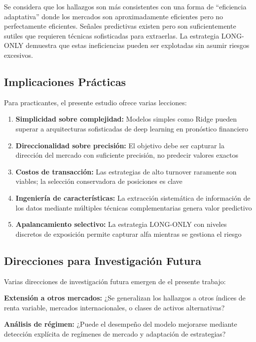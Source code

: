 \documentclass[11pt,a4paper]{article}
\begin{document}
Se considera que los hallazgos son más consistentes con una forma de ``eficiencia adaptativa'' donde los mercados son aproximadamente eficientes pero no perfectamente eficientes. Señales predictivas existen pero son suficientemente sutiles que requieren técnicas sofisticadas para extraerlas. La estrategia LONG-ONLY demuestra que estas ineficiencias pueden ser explotadas sin asumir riesgos excesivos.

\subsection{Implicaciones Prácticas}

Para practicantes, el presente estudio ofrece varias lecciones:

\begin{enumerate}[noitemsep]
    \item \textbf{Simplicidad sobre complejidad:} Modelos simples como Ridge pueden superar a arquitecturas sofisticadas de deep learning en pronóstico financiero
    \item \textbf{Direccionalidad sobre precisión:} El objetivo debe ser capturar la dirección del mercado con suficiente precisión, no predecir valores exactos
    \item \textbf{Costos de transacción:} Las estrategias de alto turnover raramente son viables; la selección conservadora de posiciones es clave
    \item \textbf{Ingeniería de características:} La extracción sistemática de información de los datos mediante múltiples técnicas complementarias genera valor predictivo
    \item \textbf{Apalancamiento selectivo:} La estrategia LONG-ONLY con niveles discretos de exposición permite capturar alfa mientras se gestiona el riesgo
\end{enumerate}

\subsection{Direcciones para Investigación Futura}

Varias direcciones de investigación futura emergen de el presente trabajo:

\textbf{Extensión a otros mercados:} ¿Se generalizan los hallazgos a otros índices de renta variable, mercados internacionales, o clases de activos alternativas?

\textbf{Análisis de régimen:} ¿Puede el desempeño del modelo mejorarse mediante detección explícita de regímenes de mercado y adaptación de estrategias?
\end{document}
